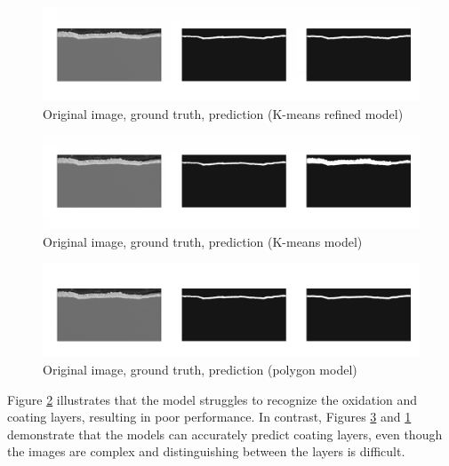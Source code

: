 \newpage

\begin{figure}[H]
    \centering
    \includegraphics[width=1\linewidth]{PICTURES/refined_188_5_128_16_9.png}
    \caption{Original image, ground truth, prediction (K-means refined model)}
    \label{fig:refined_188_5_128_16_9}
\end{figure}

\begin{figure}[H]
    \centering
    \includegraphics[width=1\linewidth]{PICTURES/kmeans_188_5_128_16_0.png}
    \caption{Original image, ground truth, prediction (K-means model)}
    \label{fig:kmeans_188_5_128_16_0}
\end{figure}

\begin{figure}[H]
    \centering
    \includegraphics[width=1\linewidth]{PICTURES/polygon_188_5_128_16_0.png}
    \caption{Original image, ground truth, prediction (polygon model)}
    \label{fig:polygon_188_5_128_16_0}
\end{figure}

Figure \ref{fig:kmeans_188_5_128_16_0} illustrates that the model struggles to recognize the oxidation and coating layers, resulting in poor performance. In contrast, Figures \ref{fig:polygon_188_5_128_16_0} and \ref{fig:refined_188_5_128_16_9} demonstrate that the models can accurately predict coating layers, even though the images are complex and distinguishing between the layers is difficult.
